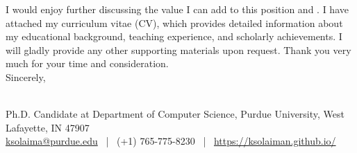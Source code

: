 \documentclass[9pt]{article}
\begin{document}

I would enjoy further discussing the value I can add to this position and \InstitutionName{}. I have attached my curriculum vitae (CV), which provides detailed information about my educational background, teaching experience, and scholarly achievements. 
I will gladly provide any other supporting materials upon request. Thank you very much for your time and consideration.\\



Sincerely, 

\Name{} \\
\normalsize  \textnormal{
          Ph.D. Candidate at Department of Computer Science, Purdue University, West Lafayette, IN 47907
        }\\
        \normalsize \textnormal{ %
          \href{mailto:ksolaima@purdue.edu}{ksolaima@purdue.edu} ~|~ %
          (+1) 765-775-8230 ~|~ %
          \href{https://ksolaiman.github.io/}{https://ksolaiman.github.io/}
}

\end{document}
